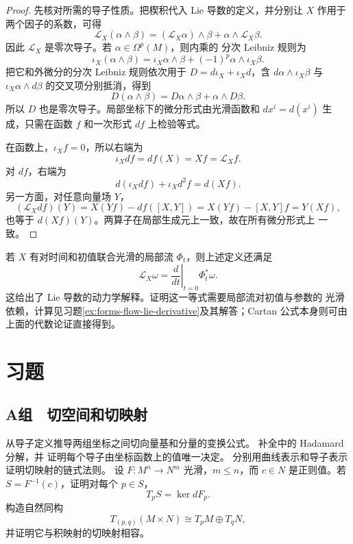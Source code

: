 \begin{proof}
先核对所需的导子性质。把楔积代入 Lie 导数的定义，并分别让 \(X\) 作用于
两个因子的系数，可得
\[
 \mathcal L_X(\alpha\wedge\beta)
 =(\mathcal L_X\alpha)\wedge\beta
  +\alpha\wedge\mathcal L_X\beta .
\]
因此 \(\mathcal L_X\) 是零次导子。若 \(\alpha\in\Omega^p(M)\)，则内乘的
分次 Leibniz 规则为
\[
 \iota_X(\alpha\wedge\beta)
 =\iota_X\alpha\wedge\beta+(-1)^p\alpha\wedge\iota_X\beta.
\]
把它和外微分的分次 Leibniz 规则依次用于
\(D=d\iota_X+\iota_Xd\)，含
\(d\alpha\wedge\iota_X\beta\) 与
\(\iota_X\alpha\wedge d\beta\) 的交叉项分别抵消，得到
\[
 D(\alpha\wedge\beta)=D\alpha\wedge\beta+\alpha\wedge D\beta.
\]
所以 \(D\) 也是零次导子。局部坐标下的微分形式由光滑函数和
\(dx^i=d(x^i)\) 生成，只需在函数 \(f\) 和一次形式 \(df\) 上检验等式。

在函数上，\(\iota_Xf=0\)，所以右端为
\[
 \iota_Xdf=df(X)=Xf=\mathcal L_Xf.
\]
对 \(df\)，右端为
\[
 d(\iota_Xdf)+\iota_Xd^2f=d(Xf).
\]
另一方面，对任意向量场 \(Y\)，
\[
 (\mathcal L_Xdf)(Y)
 =X(Yf)-df([X,Y])
 =X(Yf)-[X,Y]f
 =Y(Xf),
\]
也等于 \(d(Xf)(Y)\)。两算子在局部生成元上一致，故在所有微分形式上
一致。
\end{proof}

若 \(X\) 有对时间和初值联合光滑的局部流 \(\Phi_t\)，则上述定义还满足
\[
 \mathcal L_X\omega
 =\left.\frac{d}{dt}\right|_{t=0}\Phi_t^*\omega.
\]
这给出了 Lie 导数的动力学解释。证明这一等式需要局部流对初值与参数的
光滑依赖，计算见习题\ref{ex:forms-flow-lie-derivative}及其解答；Cartan
公式本身则可由上面的代数论证直接得到。

\section*{习题}

\subsection*{A组　切空间和切映射}
\begin{enumerate}[label=\textbf{\thechapter.\arabic*.}]
 从导子定义推导两组坐标之间切向量基和分量的变换公式。
 补全中的 Hadamard 分解，并
 证明每个导子由坐标函数上的值唯一决定。
 分别用曲线表示和导子表示证明切映射的链式法则。
 设 \(F:M^n\to N^m\) 光滑，\(m\le n\)，而 \(c\in N\) 是正则值。若
 \(S=F^{-1}(c)\)，证明对每个 \(p\in S\)，
 \[
  T_pS=\ker dF_p .
 \]
 构造自然同构
 \[
  T_{(p,q)}(M\times N)\cong T_pM\oplus T_qN,
 \]
 并证明它与积映射的切映射相容。
\end{enumerate}

